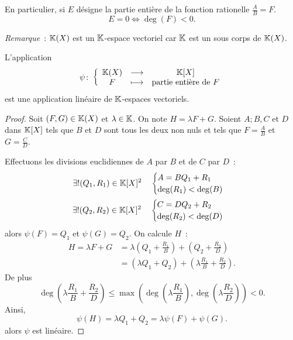 En particulier, si \(E\) désigne la partie entière de la fonction rationelle \(\frac{A}{B}=F\).
\begin{equation}
  E=0 \iff \deg(F) <0.
\end{equation}

\emph{Remarque}~: \(\mathbb{K}(X)\) est un \(\mathbb{K}\)-espace vectoriel car \(\mathbb{K}\) est un sous corps de \(\mathbb{K}(X)\).

\begin{prop}
  L'application
  \begin{equation}
    \psi\colon \left\{\begin{array}{ccc} \mathbb{K}(X) & \longrightarrow &\mathbb{K}[X]\\ F & \longmapsto & \text{partie entière de } F \end{array} \right.
  \end{equation}
  est une application linéaire de \(\mathbb{K}\)-espaces vectoriels.
\end{prop}
\begin{proof}
  Soit \((F,G) \in \mathbb{K}(X)\) et \(\lambda \in \mathbb{K}\). On note \(H=\lambda F+G\). Soient \(A;B,C\) et \(D\) dans \(\mathbb{K}[X]\) tels que \(B\) et \(D\) sont tous les deux non nuls et tels que \(F=\frac{A}{B}\) et \(G=\frac{C}{D}\).

  Effectuons les divisions euclidiennes de \(A\) par \(B\) et de \(C\) par \(D\)~:
  \begin{align}
    \exists! (Q_1,R_1) \in \mathbb{K}[X]^2 \quad \begin{cases} A = BQ_1+R_1 \\ \deg(R_1) < \deg(B) \end{cases} \\ 
    \exists! (Q_2,R_2) \in \mathbb{K}[X]^2 \quad \begin{cases} C = DQ_2+R_2 \\ \deg(R_2) < \deg(D) \end{cases}
  \end{align}
  alors \(\psi(F)=Q_1\) et \(\psi(G)=Q_2\). On calcule \(H\)~:
  \begin{align}
    H = \lambda F+G &= \lambda\left(Q_1+\frac{R_1}{B}\right)+\left(Q_2+\frac{R_2}{D}\right) \\
    &=(\lambda Q_1 +Q_2) +\left(\lambda \frac{R_1}{B} +\frac{R_2}{D} \right).
  \end{align}
  De plus
  \begin{equation}
    \deg\left(\lambda \frac{R_1}{B} +\frac{R_2}{D} \right) \leqslant \max\left(\deg\left(\lambda \frac{R_1}{B}\right),\deg\left(\lambda \frac{R_2}{D}\right)\right) <0.
  \end{equation}
  Ainsi,
  \begin{equation}
    \psi(H)= \lambda Q_1+Q_2 = \lambda \psi(F)+\psi(G).
  \end{equation}
  alors \(\psi\) est linéaire.
\end{proof}

